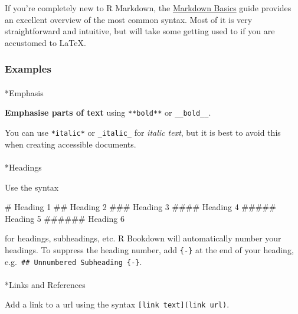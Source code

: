 \documentclass[
  letterpaper,
]{article}
\makeatletter
\let\oldparagraph\paragraph
\renewcommand{\paragraph}{
    \@ifstar
      \xxxParagraphStar
      \xxxParagraphNoStar
  }
\newcommand{\xxxParagraphStar}[1]{\oldparagraph*{#1}\mbox{}}
\newcommand{\xxxParagraphNoStar}[1]{\oldparagraph{#1}\mbox{}}
\newenvironment{Shaded}{\begin{snugshade}}{\end{snugshade}}
\newcommand{\FunctionTok}[1]{\textcolor[rgb]{0.28,0.35,0.67}{#1}}
\numberwithin{equation}{section}
\numberwithin{figure}{section}
\theoremstyle{break}
\makeatother
\begin{document}
If you're completely new to R Markdown, the
\href{https://rmarkdown.rstudio.com/authoring_basics.html?target=_blank}{Markdown
Basics} guide provides an excellent overview of the most common syntax.
Most of it is very straightforward and intuitive, but will take some
getting used to if you are accustomed to LaTeX.

\subsubsection{Examples}\label{examples}

\paragraph*{Emphasis}\label{emphasis}

\textbf{Emphasise parts of text} using \texttt{**bold**} or
\texttt{\_\_bold\_\_}.

You can use \texttt{*italic*} or \texttt{\_italic\_} for \emph{italic
text}, but it is best to avoid this when creating accessible documents.

\paragraph*{Headings}\label{headings}

Use the syntax

\begin{Shaded}
\begin{Highlighting}[]
\FunctionTok{\# Heading 1}
\FunctionTok{\#\# Heading 2}
\FunctionTok{\#\#\# Heading 3}
\FunctionTok{\#\#\#\# Heading 4}
\FunctionTok{\#\#\#\#\# Heading 5}
\FunctionTok{\#\#\#\#\#\# Heading 6}
\end{Highlighting}
\end{Shaded}

for headings, subheadings, etc. R Bookdown will automatically number
your headings. To suppress the heading number, add \texttt{\{-\}} at the
end of your heading, e.g.~\texttt{\#\#\ Unnumbered\ Subheading\ \{-\}}.

\paragraph*{Links and References}\label{links-and-references}

Add a link to a url using the syntax
\texttt{{[}link\ text{]}(link\ url)}.
\end{document}
